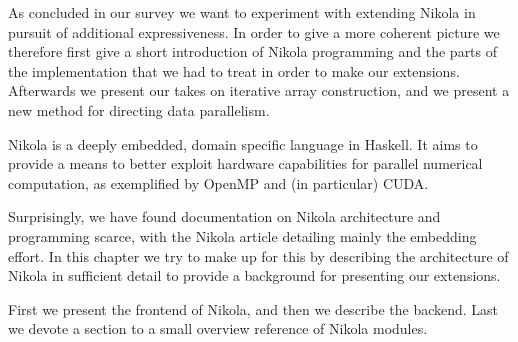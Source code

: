 As concluded in our survey we want to experiment with extending Nikola in
pursuit of additional expressiveness. In order to give a more coherent picture
we therefore first give a short introduction of Nikola programming and the
parts of the implementation that we had to treat in order to make our
extensions.  Afterwards we present our takes on iterative array construction,
and we present a new method for directing data parallelism.

\vspace{1em}

Nikola is a deeply embedded, domain specific language in Haskell. It aims to
provide a means to better exploit hardware capabilities for parallel numerical
computation, as exemplified by OpenMP and (in particular) CUDA.

Surprisingly, we have found documentation on Nikola architecture and
programming scarce, with the Nikola article \cite{mainland2010nikola}
detailing mainly the embedding effort. In this chapter we try to make up for
this by describing the architecture of Nikola in sufficient detail to provide a
background for presenting our extensions.

First we present the frontend of Nikola, and then we describe the backend. Last
we devote a section to a small overview reference of Nikola modules.

